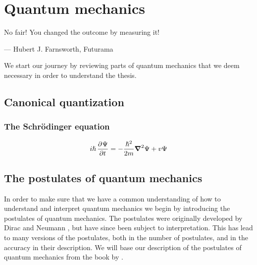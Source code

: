 \chapter{Quantum mechanics}
    \epigraph{No fair! You changed the outcome by measuring it!}
    {--- Hubert J. Farnsworth, Futurama}

    We start our journey by reviewing parts of quantum mechanics that we deem
    necessary in order to understand the thesis.


    \section{Canonical quantization}
        \subsection{The Schrödinger equation}
            \begin{align}
                i\hslash\dpd{\Psi}{t}
                = -\frac{\hslash^2}{2m}\vfg{\nabla}^2\Psi
                +    v\Psi
                \label{eq:coordinate-tdse}
            \end{align}

    \section{The postulates of quantum mechanics}
        In order to make sure that we have a common understanding of how to
        understand and interpret quantum mechanics we begin by introducing the
        postulates of quantum mechanics.
        The postulates were originally developed by Dirac
        \cite{dirac1981principles} and Neumann \cite{von2018mathematical},
        but have since been subject to interpretation.
        This has lead to many versions of the postulates, both in the number of
        postulates, and in the accuracy in their description.
        We will base our description of the postulates of quantum mechanics from
        the book  by
        \citeauthor{salasnich2017quantum} \cite{salasnich2017quantum}.

